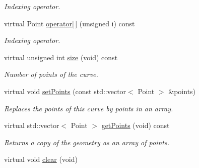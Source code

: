 \begin{DoxyCompactItemize}
\begin{DoxyCompactList}\small\item\em Indexing operator. \end{DoxyCompactList}\item 
virtual Point \hyperlink{classPolygonalCurve_a993101c839429b2fb6ba4cf487361ada}{operator\mbox{[}$\,$\mbox{]}} (unsigned i) const 
\begin{DoxyCompactList}\small\item\em Indexing operator. \end{DoxyCompactList}\item 
\hypertarget{classPolygonalCurve_a91364778853718941b3dbf565c855d4e}{
virtual unsigned int \hyperlink{classPolygonalCurve_a91364778853718941b3dbf565c855d4e}{size} (void) const }
\label{classPolygonalCurve_a91364778853718941b3dbf565c855d4e}

\begin{DoxyCompactList}\small\item\em Number of points of the curve. \end{DoxyCompactList}\item 
virtual void \hyperlink{classPolygonalCurve_aadc2f51560426339d1c35fef915b912e}{setPoints} (const std::vector$<$ Point $>$ \&points)
\begin{DoxyCompactList}\small\item\em Replaces the points of this curve by points in an array. \end{DoxyCompactList}\item 
virtual std::vector$<$ Point $>$ \hyperlink{classPolygonalCurve_ab1e13268817ca534f9d8d6e1b4659b57}{getPoints} (void) const 
\begin{DoxyCompactList}\small\item\em Returns a copy of the geometry as an array of points. \end{DoxyCompactList}\item 
\hypertarget{classPolygonalCurve_af696b07d5ccf516da70451b1a8de1144}{
virtual void \hyperlink{classPolygonalCurve_af696b07d5ccf516da70451b1a8de1144}{clear} (void)}
\label{classPolygonalCurve_af696b07d5ccf516da70451b1a8de1144}


\end{DoxyCompactItemize}
